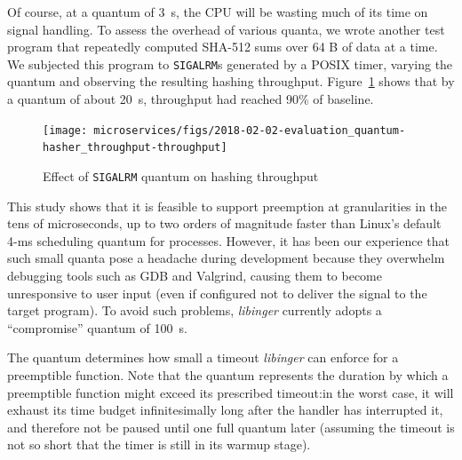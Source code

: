 Of course, at a quantum of 3~\textmu{}s, the CPU will be wasting much of its time on
signal handling.  To assess the overhead of various quanta, we wrote another test
program
that repeatedly computed SHA-512 sums over 64 B of data at a time.  We subjected this
program to \texttt{SIGALRM}s generated by a POSIX timer, varying the quantum and
observing the resulting hashing throughput.  Figure~\ref{fig:shatput} shows that by a
quantum of about 20~\textmu{}s, throughput had reached 90\% of baseline.

\begin{figure}
\texttt{[image: microservices/figs/2018-02-02-evaluation\_quantum-hasher\_throughput-throughput]}
\caption{Effect of \texttt{SIGALRM} quantum on hashing throughput}
\label{fig:shatput}
\end{figure}

This study shows that it is feasible to support preemption at granularities in the
tens of microseconds, up to two orders of magnitude faster than Linux's default 4-ms
scheduling quantum for processes.  However, it has been our experience that such
small quanta pose a headache during development because they overwhelm debugging
tools such as GDB and Valgrind, causing them to become unresponsive to user input
(even if configured not to deliver the signal to the target program).  To avoid such
problems, \textit{libinger} currently adopts a ``compromise'' quantum of
100~\textmu{}s.

The quantum determines how small a timeout \textit{libinger} can enforce for a
preemptible function.  Note that the quantum represents the duration by which a
preemptible
function might exceed its prescribed timeout:\@ in the worst case, it will exhaust
its time budget infinitesimally long after the handler has interrupted it, and
therefore not be paused until one full quantum later (assuming the timeout is not so
short that the timer is still in its warmup stage).

